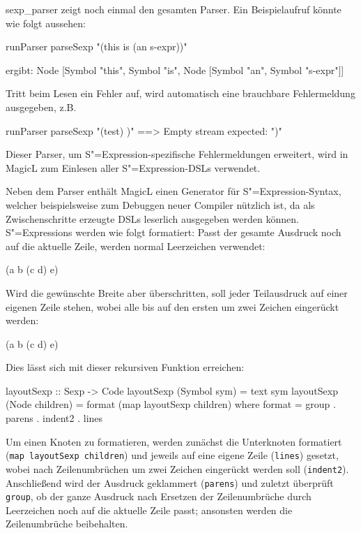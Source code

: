 \documentclass[12pt, a4paper, bibgerm]{scrbook}
\newenvironment{DIFnomarkup}{}{}
\newcommand\icode[1]{\lstinline?#1?}
\newcommand\abb{}
\newcommand{\sexp}{S"=Expression}
\newcommand{\sexps}{S"=Expressions}
\begin{document}
\abb{sexp_parser} zeigt noch einmal den gesamten Parser. Ein
Beispielaufruf könnte wie folgt aussehen:
\begin{code}
runParser parseSexp "(this is (an s-expr))"  

ergibt: 
Node [Symbol "this", Symbol "is", Node [Symbol "an", Symbol "s-expr"]]
\end{code}
Tritt beim Lesen ein Fehler auf, wird automatisch eine brauchbare
Fehlermeldung ausgegeben, z.B.
\begin{DIFnomarkup}\begin{code}
runParser parseSexp "(test) )"  ==>  Empty stream expected: ")"
\end{code}\end{DIFnomarkup}
Dieser Parser, um \sexp{}-spezifische Fehlermeldungen erweitert, 
wird in MagicL zum Einlesen aller \sexp{}-DSLs verwendet.

Neben dem Parser enthält MagicL einen Generator für \sexp{}-Syntax,
welcher beispielsweise zum Debuggen neuer Compiler nützlich ist, da als
Zwischenschritte erzeugte DSLs leserlich ausgegeben werden können.
\sexps{} werden wie folgt formatiert: Passt der gesamte Ausdruck noch
auf die aktuelle Zeile, werden normal Leerzeichen verwendet:
\begin{DIFnomarkup}\begin{code}
(a b (c d) e)
\end{code}\end{DIFnomarkup}
Wird die gewünschte Breite aber überschritten, soll jeder Teilausdruck
auf einer eigenen Zeile stehen, wobei alle bis auf den ersten um zwei
Zeichen eingerückt werden:
\begin{DIFnomarkup}\begin{code}
(a
  b
  (c d)
  e)
\end{code}\end{DIFnomarkup}
Dies lässt sich mit dieser rekursiven Funktion erreichen:
\begin{DIFnomarkup}\begin{code}
layoutSexp :: Sexp -> Code
layoutSexp (Symbol sym)    = text sym
layoutSexp (Node children) = format (map layoutSexp children)
  where format = group . parens . indent2 . lines
\end{code}\end{DIFnomarkup} %

Um einen Knoten zu formatieren, werden zunächst die Unterknoten
formatiert \\ (\icode{map layoutSexp children}) und jeweils auf eine eigene
Zeile (\icode{lines}) gesetzt, wobei nach Zeilenumbrüchen um zwei
Zeichen eingerückt werden soll (\icode{indent2}). Anschließend wird
der Ausdruck geklammert (\icode{parens}) und zuletzt überprüft
\icode{group}, ob der ganze Ausdruck nach Ersetzen der Zeilenumbrüche
durch Leerzeichen noch auf die aktuelle Zeile passt; ansonsten werden
die Zeilenumbrüche beibehalten.
\end{document}
